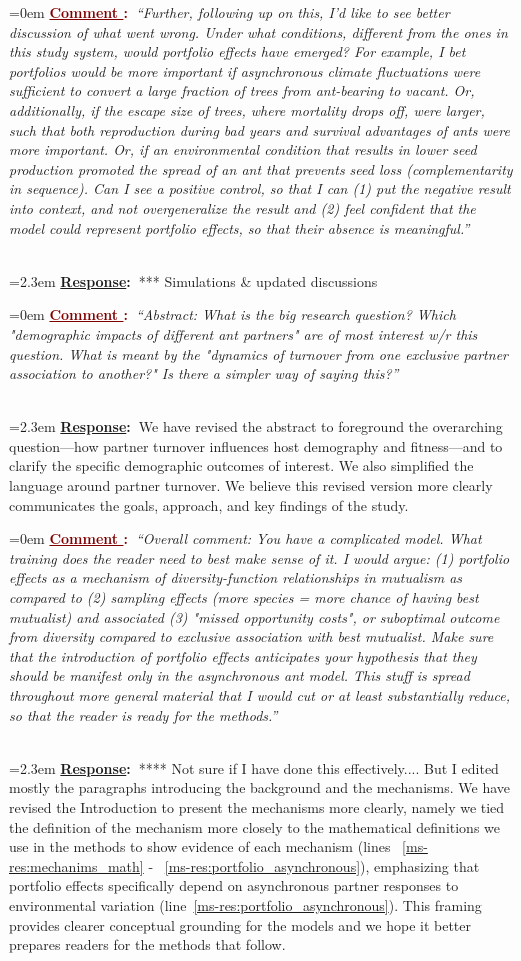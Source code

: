 \documentclass[12pt]{article}
\newcounter{cN}
\newcommand{\comment}[1]{
	\vspace{2em}
	\refstepcounter{cN} %
	\noindent \hangindent=0em \textbf{\textcolor{Maroon}{\uline{Comment \thecN}:~}}\emph{``#1''}
	}
\newcommand{\response}[1]{
	\\[0.25em]
	\hangindent=2.3em \textbf{\textcolor{NavyBlue}{\uline{Response}:~}}#1
	}
\begin{document}
\comment{Further, following up on this, I'd like to see better discussion of what went wrong. 
Under what conditions, different from the ones in this study system, would portfolio effects have emerged? 
For example, I bet portfolios would be more important if asynchronous climate fluctuations were sufficient to convert a large fraction of trees from ant-bearing to vacant. 
Or, additionally, if the escape size of trees, where mortality drops off, were larger, such that both reproduction during bad years and survival advantages of ants were more important.  
Or, if an environmental condition that results in lower seed production promoted the spread of an ant that prevents seed loss (complementarity in sequence).
Can I see a positive control, so that I can (1) put the negative result into context, and not overgeneralize the result and (2) feel confident that the model could represent portfolio effects, so that their absence is meaningful.}
\response{*** Simulations \& updated discussions}

\comment{Abstract: What is the big research question? 
Which "demographic impacts of different ant partners" are of most interest w/r this question. 
What is meant by the "dynamics of turnover from one exclusive partner association to another?" Is there a simpler way of saying this?}
\response{We have revised the abstract to foreground the overarching question—how partner turnover influences host demography and fitness—and to clarify the specific demographic outcomes of interest. 
We also simplified the language around partner turnover.
We believe this revised version more clearly communicates the goals, approach, and key findings of the study.}

\comment{Overall comment: You have a complicated model. 
What training does the reader need to best make sense of it. 
I would argue: (1) portfolio effects as a mechanism of diversity-function relationships in mutualism as compared to (2) sampling effects (more species = more chance of having best mutualist) and associated (3) "missed opportunity costs", or suboptimal outcome from diversity compared to exclusive association with best mutualist. 
Make sure that the introduction of portfolio effects anticipates your hypothesis that they should be manifest only in the asynchronous ant model. 
This stuff is spread throughout more general material that I would cut or at least substantially reduce, so that the reader is ready for the methods.}
\response{**** Not sure if I have done this effectively.... But I edited mostly the paragraphs introducing the background and the mechanisms.
We have revised the Introduction to present the mechanisms more clearly, namely we tied the definition of the mechanism more closely to the mathematical definitions we use in the methods to show evidence of each mechanism (lines ~\ref{ms-res:mechanims_math} - ~\ref{ms-res:portfolio_asynchronous}), emphasizing that portfolio effects specifically depend on asynchronous partner responses to environmental variation (line~\ref{ms-res:portfolio_asynchronous}).
This framing provides clearer conceptual grounding for the models and we hope it better prepares readers for the methods that follow.}
\end{document}
